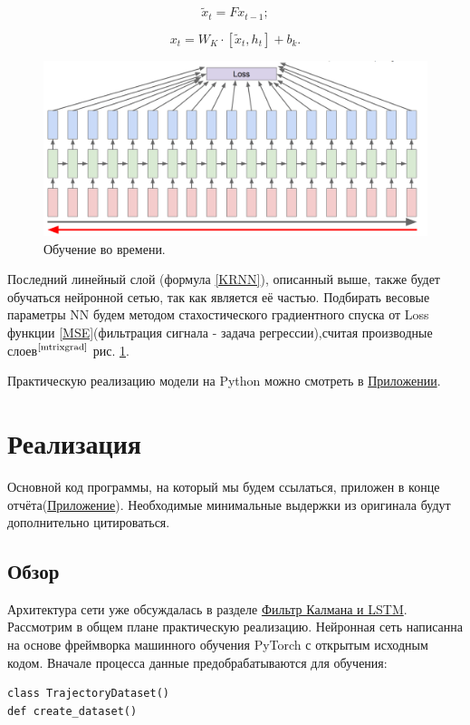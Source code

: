 \documentclass[a4paper,11pt]{article} %
\begin{document}
$$\widetilde{x}_t =Fx_{t-1};$$

\begin{equation}\label{KRNN}
x_t=W_K\cdot[\widetilde{x}_t,h_t]+b_k.
\end{equation}


\begin{figure}[h!]
\begin{center}
\includegraphics[width=1\textwidth]{images/RNN5}
\end{center}
\caption{Обучение во времени.} \label{RNN5}
\end{figure}

Последний линейный слой (формула \ref{KRNN}),  описанный выше, также будет обучаться нейронной сетью, так как является её частью. Подбирать весовые параметры NN будем методом стахостического градиентного спуска от Loss функции \ref{MSE}(фильтрация сигнала - задача регрессии),считая производные слоев$^\text{\cite{mtrixgrad}}$ рис.  \ref{RNN5}.

Практическую реализацию модели на Python можно смотреть в \hyperref[appendix]{Приложении}.
\newpage
\section{Реализация}

Основной код программы, на который мы будем ссылаться,  приложен  в конце отчёта(\hyperref[appendix]{Приложение}). Необходимые минимальные выдержки из оригинала будут дополнительно цитироваться.

\subsection{Обзор}

Архитектура сети уже обсуждалась в разделе \hyperref[RNNfilter]{Фильтр Калмана и LSTM}. Рассмотрим в общем плане практическую реализацию.  Нейронная сеть написанна на основе фреймворка машинного обучения PyTorch с открытым исходным кодом. Вначале процесса данные предобрабатываются для обучения:
\begin{lstlisting}
class TrajectoryDataset() 
def create_dataset()
\end{lstlisting}
\end{document}
